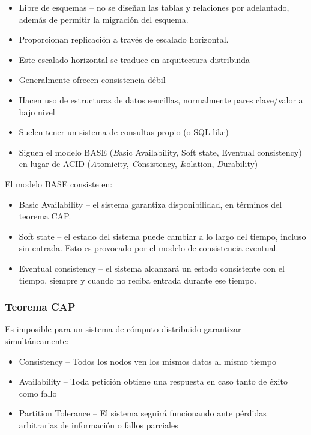 \documentclass[
]{book}
\providecommand{\tightlist}{%
  \setlength{\itemsep}{0pt}\setlength{\parskip}{0pt}}
\begin{document}
\begin{itemize}
\tightlist
\item
  Libre de esquemas -- no se diseñan las tablas y relaciones por adelantado, además de permitir la migración del esquema.
\item
  Proporcionan replicación a través de escalado horizontal.
\item
  Este escalado horizontal se traduce en arquitectura distribuida
\item
  Generalmente ofrecen consistencia débil
\item
  Hacen uso de estructuras de datos sencillas, normalmente pares clave/valor a bajo nivel
\item
  Suelen tener un sistema de consultas propio (o SQL-like)
\item
  Siguen el modelo BASE (\emph{B}asic Availability, Soft state, Eventual consistency) en lugar de ACID (\emph{A}tomicity, \emph{C}onsistency, \emph{I}solation, \emph{D}urability)
\end{itemize}

El modelo BASE consiste en:

\begin{itemize}
\tightlist
\item
  Basic Availability -- el sistema garantiza disponibilidad, en términos del teorema CAP.
\item
  Soft state -- el estado del sistema puede cambiar a lo largo del tiempo, incluso sin entrada. Esto es provocado por el modelo de consistencia eventual.
\item
  Eventual consistency -- el sistema alcanzará un estado consistente con el tiempo, siempre y cuando no reciba entrada durante ese tiempo.
\end{itemize}

\subsubsection{Teorema CAP}\label{teorema-cap}

Es imposible para un sistema de cómputo distribuido garantizar simultáneamente:

\begin{itemize}
\tightlist
\item
  Consistency -- Todos los nodos ven los mismos datos al mismo tiempo
\item
  Availability -- Toda petición obtiene una respuesta en caso tanto de éxito como fallo
\item
  Partition Tolerance -- El sistema seguirá funcionando ante pérdidas arbitrarias de información o fallos parciales
\end{itemize}
\end{document}
